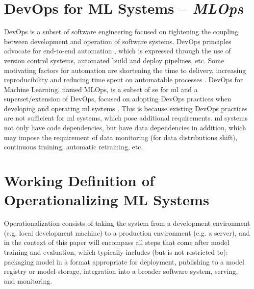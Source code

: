 \section{DevOps for ML Systems -- \emph{MLOps}}
DevOps is a subset of software engineering focused on tightening the coupling between development and operation of software systems.
DevOps principles advocate for end-to-end automation \cite{Ebert2016}, which is expressed through the use of version control systems, automated build and deploy pipelines, etc.
Some motivating factors for automation are shortening the time to delivery, increasing reproducibility and reducing time spent on automatable processes \cite{Franca2016}.
DevOps for Machine Learning, named MLOps, is a subset of \acrshort{se} for \acrshort{ml} and a superset/extension of DevOps, focused on adopting DevOps practices when developing and operating \acrshort{ml} systems \cite{Soh2020}.
This is because existing DevOps practices are not sufficient for \acrshort{ml} systems, which pose additional requirements.
\acrshort{ml} systems not only have code dependencies, but have data dependencies in addition, which may impose the requirement of data monitoring (for data distributions shift), continuous training, automatic retraining, etc.

\section{Working Definition of Operationalizing ML Systems}
\label{sec:deploying_ml_systems}
Operationalization consists of taking the system from a development environment (e.g. local development machine) to a production environment (e.g. a server), and in the context of this paper will encompass all steps that come after model training and evaluation, which typically includes (but is not restricted to): packaging model in a format appropriate for deployment, publishing to a model registry or model storage, integration into a broader software system, serving, and monitoring.
